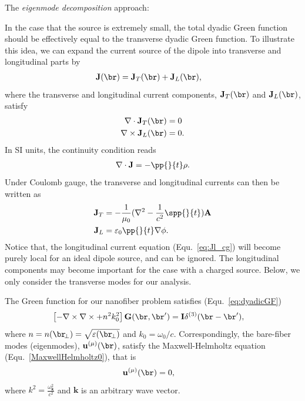 \documentclass[]{report}
\begin{document}
The \textit{eigenmode decomposition} approach:

In the case that the source is extremely small, the total dyadic Green function should be effectively equal to the transverse dyadic Green function. To illustrate this idea, we can expand the current source of the dipole into transverse and longitudinal parts by
\begin{align}
\mathbf{J}(\br) &= \mathbf{J}_T(\br) + \mathbf{J}_L(\br),
\end{align}
where the transverse and longitudinal current components, $ \mathbf{J}_T(\br) $ and $\mathbf{J}_L(\br)$, satisfy
\begin{align}
\nabla\cdot\mathbf{J}_T (\br) &=0\\
\nabla\times \mathbf{J}_L (\br) &=0.
\end{align}
In SI units, the continuity condition reads
\begin{align}
\nabla\cdot\mathbf{J}=-\pp{}{t}\rho.
\end{align}
Under Coulomb gauge, the transverse and longitudinal currents can then be written as 
\begin{align}
\mathbf{J}_T &= -\frac{1}{\mu_0}(\nabla^2 -\frac{1}{c^2}\spp{}{t})\mathbf{A}\label{eq:Jt_cg}\\
\mathbf{J}_L &= \varepsilon_0 \pp{}{t}\nabla\phi .\label{eq:Jl_cg}
\end{align}
Notice that, the longitudinal current equation (Equ.~\eqref{eq:Jl_cg}) will become purely local for an ideal dipole source, and can be ignored. The longitudinal components may become important for the case with a charged source. Below, we only consider the transverse modes for our analysis.

The Green function for our nanofiber problem satisfies (Equ.~\eqref{eq:dyadicGF})
\begin{align}
\left[ -\nabla\times\nabla\times + n^2k_0^2 \right] \mathbf{G}(\br,\br') &= \mathbf{I}\delta^{(3)}(\br-\br'),
\end{align}
where $n=n(\br\!_\perp)=\sqrt{\varepsilon(\br\!_\perp)}$ and $k_0=\omega_0/c$. Correspondingly, the bare-fiber modes (eigenmodes), $ \mathbf{u}^{(\mu)}(\br) $, satisfy the Maxwell-Helmholtz equation (Equ.~\eqref{MaxwellHelmholtz0}), that is
\begin{align}
[-\nabla\times\nabla\times + n^2(\br)k^2]  \mathbf{u}^{(\mu)}(\br) &=0,
\end{align}
where $ k^2=\frac{\omega_{\mathbf{k}}^2}{c^2} $ and $ \mathbf{k} $ is an arbitrary wave vector.
\end{document}
